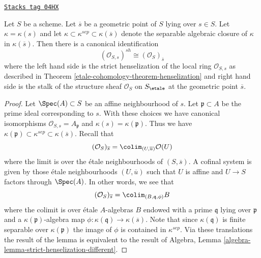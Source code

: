\begin{lemma}
\label{etale-cohomology-lemma-describe-etale-local-ring}
\href{https://stacks.math.columbia.edu/tag/04HX}{\texttt{Stacks tag 04HX}}


Let $S$ be a scheme.
Let $\overline{s}$ be a geometric point of $S$ lying over $s \in S$.
Let $\kappa = \kappa(s)$ and let
$\kappa \subset \kappa^{sep} \subset \kappa(\overline{s})$ denote
the separable algebraic closure of $\kappa$ in $\kappa(\overline{s})$.
Then there is a canonical identification
$$
(\mathcal{O}_{S, s})^{sh}
\cong
(\mathcal{O}_S)_{\overline{s}}
$$
where the left hand side is the strict henselization of the local ring
$\mathcal{O}_{S, s}$ as described in
Theorem \ref{etale-cohomology-theorem-henselization}
and right hand side is the stalk of the structure sheaf
$\mathcal{O}_S$ on $S_\etale$ at
the geometric point $\overline{s}$.
\end{lemma}

\begin{proof}
Let $\Spec(A) \subset S$ be an affine neighbourhood of $s$.
Let $\mathfrak p \subset A$ be the prime ideal corresponding to $s$.
With these choices we have canonical isomorphisms
$\mathcal{O}_{S, s} = A_{\mathfrak p}$ and $\kappa(s) = \kappa(\mathfrak p)$.
Thus we have
$\kappa(\mathfrak p) \subset \kappa^{sep} \subset \kappa(\overline{s})$.
Recall that
$$
(\mathcal{O}_S)_{\overline{s}} =
\colim_{(U, \overline{u})} \mathcal{O}(U)
$$
where the limit is over the \'etale neighbourhoods of $(S, \overline{s})$.
A cofinal system is given by those \'etale neighbourhoods $(U, \overline{u})$
such that $U$ is affine and $U \to S$ factors through $\Spec(A)$.
In other words, we see that
$$
(\mathcal{O}_S)_{\overline{s}} = \colim_{(B, \mathfrak q, \phi)} B
$$
where the colimit is over \'etale $A$-algebras $B$ endowed with a prime
$\mathfrak q$ lying over $\mathfrak p$ and a
$\kappa(\mathfrak p)$-algebra map
$\phi : \kappa(\mathfrak q) \to \kappa(\overline{s})$.
Note that since $\kappa(\mathfrak q)$ is finite separable over
$\kappa(\mathfrak p)$ the image of $\phi$ is contained in $\kappa^{sep}$.
Via these translations the result of the lemma is equivalent
to the result of
Algebra, Lemma \ref{algebra-lemma-strict-henselization-different}.
\end{proof}

